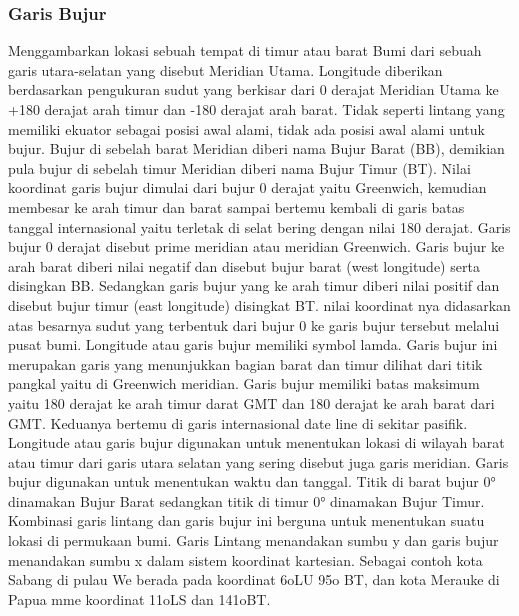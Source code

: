 \subsubsection{Garis Bujur}
Menggambarkan lokasi sebuah tempat di timur atau barat Bumi dari sebuah garis utara-selatan yang disebut Meridian Utama. Longitude diberikan berdasarkan pengukuran sudut yang berkisar dari 0 derajat Meridian Utama ke +180 derajat arah timur dan -180 derajat arah barat. Tidak seperti lintang yang memiliki ekuator sebagai posisi awal alami, tidak ada posisi awal alami untuk bujur. Bujur di sebelah barat Meridian diberi nama Bujur Barat (BB), demikian pula bujur di sebelah timur Meridian diberi nama Bujur Timur (BT).
Nilai koordinat garis bujur dimulai dari bujur 0 derajat yaitu Greenwich, kemudian membesar ke arah timur dan barat sampai bertemu kembali di garis batas tanggal internasional yaitu terletak di selat bering dengan nilai 180 derajat. Garis bujur 0 derajat disebut prime meridian atau meridian Greenwich. Garis bujur ke arah barat diberi nilai negatif dan disebut bujur barat (west longitude) serta disingkan BB. Sedangkan garis bujur yang ke arah timur diberi nilai positif dan disebut bujur timur (east longitude) disingkat BT. nilai koordinat nya didasarkan atas besarnya sudut yang terbentuk dari bujur 0 ke garis bujur tersebut melalui pusat bumi.
Longitude atau garis bujur memiliki symbol lamda. Garis bujur ini merupakan garis yang menunjukkan bagian barat dan timur dilihat dari titik pangkal yaitu di Greenwich meridian. Garis bujur memiliki batas maksimum yaitu 180 derajat ke arah timur darat GMT dan 180 derajat ke arah barat dari GMT. Keduanya bertemu di garis internasional date line di sekitar pasifik.
Longitude atau garis bujur digunakan untuk menentukan lokasi di wilayah barat atau timur dari garis utara selatan yang sering disebut juga garis meridian. Garis bujur digunakan untuk menentukan waktu dan tanggal.
Titik di barat bujur 0° dinamakan Bujur Barat sedangkan titik di timur 0° dinamakan Bujur Timur. Kombinasi garis lintang dan garis bujur ini berguna untuk menentukan suatu lokasi di permukaan bumi. Garis Lintang menandakan sumbu y dan garis bujur menandakan sumbu x dalam sistem koordinat kartesian. Sebagai contoh kota Sabang di pulau We berada pada koordinat 6oLU 95o BT, dan kota Merauke di Papua mme koordinat 11oLS dan 141oBT.
